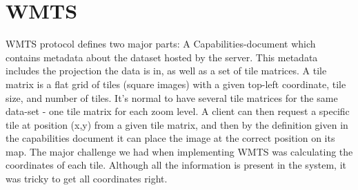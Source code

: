 \documentclass[11pt,a4paper,titlepage,oneside]{report}
\begin{document}
\section{WMTS}
\gls{WMTS} \gls{protocol} defines two major parts: A Capabilities-document which contains metadata about the dataset hosted by the server. This metadata includes the projection the data is in, as well as a set of tile matrices.  
A tile matrix is a flat grid of tiles (square images) with a given top-left coordinate, tile size, and number of tiles. It's normal to have several tile matrices for the same data-set - one tile matrix for each zoom level.  
A client can then request a specific tile at position (x,y) from a given tile matrix, and then by the definition given in the capabilities document it can place the image at the correct position on its map.  
The major challenge we had when implementing \gls{WMTS} was calculating the coordinates of each tile. Although all the information is present in the system, it was tricky to get all coordinates right. 
\end{document}
